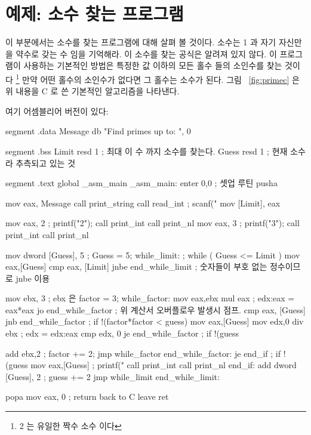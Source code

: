 \section{예제: 소수 찾는 프로그램}
이 부분에서는 소수를 찾는 프로그램에 대해 살펴 볼 것이다. 소수는 
1 과 자기 자신만을 약수로 갖는 수 임을 기억해라. 이 소수를 찾는 
공식은 알려져 있지 않다. 이 프로그램이 사용하는 기본적인 방법은 
특정한 값 이하의 모든 홀수 들의 소인수를 찾는 것이다 \footnote{2 는
유일한 짝수 소수 이다} 만약 어떤 홀수의 소인수가 없다면 그 홀수는
소수가 된다. 그림 ~\ref{fig:primec} 은 위 내용을 C 로 쓴 기본적인 
알고리즘을 나타낸다. 

여기 어셈블리어 버전이 있다:
\begin{AsmCodeListing}[label=prime.asm]
segment .data
Message         db      "Find primes up to: ", 0

segment .bss
Limit           resd    1               ; 최대 이 수 까지 소수를 찾는다. 
Guess           resd    1               ; 현재 소수라 추측되고 있는 것

segment .text
        global  _asm_main
_asm_main:
        enter   0,0               ; 셋업 루틴
        pusha

        mov     eax, Message
        call    print_string
        call    read_int             ; scanf("%
        mov     [Limit], eax

        mov     eax, 2               ; printf("2\n");
        call    print_int
        call    print_nl
        mov     eax, 3               ; printf("3\n");
        call    print_int
        call    print_nl

        mov     dword [Guess], 5     ; Guess = 5;
while_limit:                         ; while ( Guess <= Limit )
        mov     eax,[Guess]
        cmp     eax, [Limit]
        jnbe    end_while_limit      ; 숫자들이 부호 없는 정수이므로 jnbe 이용 

        mov     ebx, 3               ; ebx 은 factor = 3;
while_factor:
        mov     eax,ebx
        mul     eax                  ; edx:eax = eax*eax
        jo      end_while_factor     ; 위 계산서 오버플로우 발생시 점프.  
        cmp     eax, [Guess]
        jnb     end_while_factor     ; if !(factor*factor < guess)
        mov     eax,[Guess]
        mov     edx,0
        div     ebx                  ; edx = edx:eax %
        cmp     edx, 0
        je      end_while_factor     ; if !(guess %

        add     ebx,2                ; factor += 2;
        jmp     while_factor
end_while_factor:
        je      end_if               ; if !(guess %
        mov     eax,[Guess]          ; printf("%
        call    print_int
        call    print_nl
end_if:
        add     dword [Guess], 2     ; guess += 2
        jmp     while_limit
end_while_limit:

        popa
        mov     eax, 0            ; return back to C
        leave                     
        ret
\end{AsmCodeListing}
